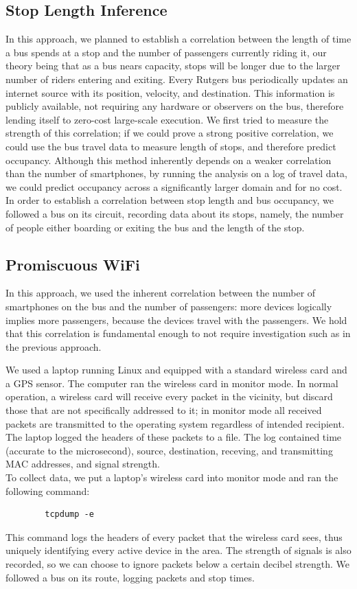 \documentclass[letterpaper,abstract=on,titlepage=false]{scrreprt}
\begin{document}
	\subsection*{Stop Length Inference}

	In this approach, we planned to establish a correlation between the length of time a bus spends at a stop and the number of passengers currently riding it, our theory being that as a bus nears capacity, stops will be longer due to the larger number of riders entering and exiting.
	Every Rutgers bus periodically updates an internet source with its position, velocity, and destination.
	This information is publicly available, not requiring any hardware or observers on the bus, therefore lending itself to zero-cost large-scale execution.
	We first tried to measure the strength of this correlation; if we could prove a strong positive correlation, we could use the bus travel data to measure length of stops, and therefore predict occupancy.
	Although this method inherently depends on a weaker correlation than the number of smartphones, by running the analysis on a log of travel data, we could predict occupancy across a significantly larger domain and for no cost.
	\\
	In order to establish a correlation between stop length and bus occupancy, we followed a bus on its circuit, recording data about its stops, namely, the number of people either boarding or exiting the bus and the length of the stop.

	\subsection*{Promiscuous WiFi}

	In this approach, we used the inherent correlation between the number of smartphones on the bus and the number of passengers: more devices logically implies more passengers, because the devices travel with the passengers.
	We hold that this correlation is fundamental enough to not require investigation such as in the previous approach.

	We used a laptop running Linux and equipped with a standard wireless card and a GPS sensor.
	The computer ran the wireless card in monitor mode.
	In normal operation, a wireless card will receive every packet in the vicinity, but discard those that are not specifically addressed to it; in monitor mode all received packets are transmitted to the operating system regardless of intended recipient.
	The laptop logged the headers of these packets to a file.
	The log contained time (accurate to the microsecond), source, destination, receving, and transmitting MAC addresses, and signal strength.
	\\
	To collect data, we put a laptop's wireless card into monitor mode and ran the following command:
	\begin{verbatim}
		tcpdump -e
	\end{verbatim}
	This command logs the headers of every packet that the wireless card sees, thus uniquely identifying every active device in the area.
	The strength of signals is also recorded, so we can choose to ignore packets below a certain decibel strength.
	We followed a bus on its route, logging packets and stop times.
\end{document}
